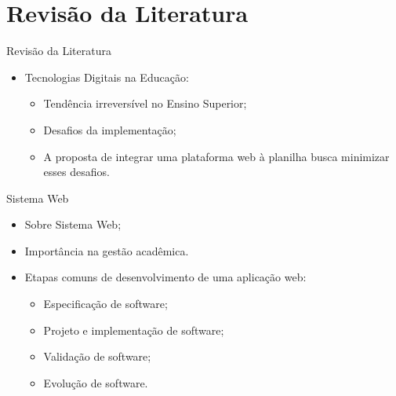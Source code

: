 \section{Revisão da Literatura}

\begin{frame}{Revisão da Literatura}
    \begin{itemize}
        \item Tecnologias Digitais na Educação: \vspace{0.5cm}
              \begin{itemize}
                  \item Tendência irreversível no Ensino Superior; \vspace{0.5cm}
                  \item Desafios da implementação; \vspace{0.5cm}
                  \item A proposta de integrar uma plataforma web à planilha busca minimizar esses desafios. \vspace{0.5cm}
              \end{itemize}
    \end{itemize}
\end{frame}

\begin{frame}{Sistema Web}
    \begin{itemize}
        \item Sobre Sistema Web; \vspace{0.5cm}
        \item Importância na gestão acadêmica. \vspace{0.5cm}
        \item Etapas comuns de desenvolvimento de uma aplicação web: \vspace{0.5cm}
              \begin{itemize}
                  \item Especificação de software; \vspace{0.5cm}
                  \item Projeto e implementação de software; \vspace{0.5cm}
                  \item Validação de software; \vspace{0.5cm}
                  \item Evolução de software. \vspace{0.5cm}
              \end{itemize}
    \end{itemize}
\end{frame}

